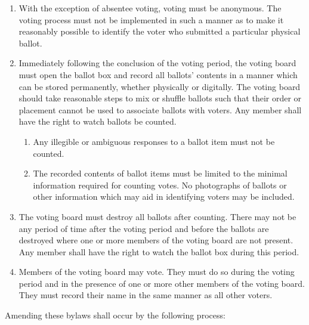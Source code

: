 \documentclass[11pt]{article}
\newcounter{h1}
\newcounter{h2}[h1]
\newcounter{h3}[h2]
\begin{document}
\begin{enumerate}
\begin{enumerate}
    \item Submit an absentee ballot to the voting board prior to or during the voting period, in a manner which permits the voting board to unambiguously identify the voter. Anonymity shall not be possible with this process, and all members of the voting board or ballot watchers may inspect the means by which absentee ballots are validated and counted.
  \end{enumerate}
  \item With the exception of absentee voting, voting must be anonymous. The voting process must not be implemented in such a manner as to make it reasonably possible to identify the voter who submitted a particular physical ballot.
  \item Immediately following the conclusion of the voting period, the voting board must open the ballot box and record all ballots' contents in a manner which can be stored permanently, whether physically or digitally. The voting board should take reasonable steps to mix or shuffle ballots such that their order or placement cannot be used to associate ballots with voters. Any member shall have the right to watch ballots be counted.
  \begin{enumerate}
    \item Any illegible or ambiguous responses to a ballot item must not be counted.
    \item The recorded contents of ballot items must be limited to the minimal information required for counting votes. No photographs of ballots or other information which may aid in identifying voters may be included.
  \end{enumerate}
  \item The voting board must destroy all ballots after counting. There may not be any period of time after the voting period and before the ballots are destroyed where one or more members of the voting board are not present. Any member shall have the right to watch the ballot box during this period.
  \item Members of the voting board may vote. They must do so during the voting period and in the presence of one or more other members of the voting board. They must record their name in the same manner as all other voters.
\end{enumerate}


Amending these bylaws shall occur by the following process:
\end{document}
